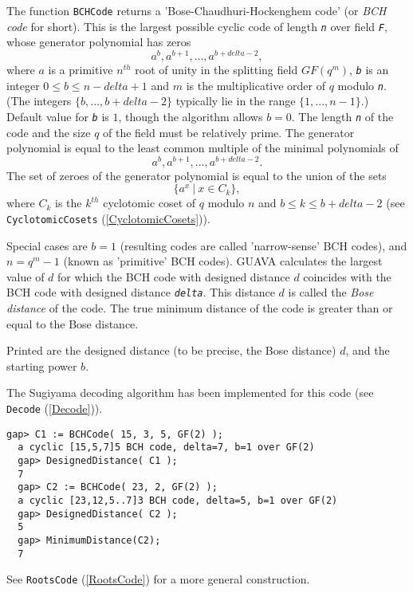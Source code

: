 \documentclass[a4paper,11pt]{report}
\begin{document}
{{{ The function \texttt{BCHCode} returns a 'Bose-Chaudhuri-Hockenghem code' (or \emph{BCH code} for short). This is the largest possible cyclic code of length \mbox{\texttt{\slshape n}} over field \mbox{\texttt{\slshape F}}, whose generator polynomial has zeros 
\[ a^{b},a^{b+1}, ..., a^{b+delta-2}, \]
 where $a$ is a primitive $n^{th}$ root of unity in the splitting field $GF(q^m)$, \mbox{\texttt{\slshape b}} is an integer $0\leq b\leq n-delta+1$ and $m$ is the multiplicative order of $q$ modulo \mbox{\texttt{\slshape n}}. (The integers $\{b,...,b+delta-2\}$ typically lie in the range $\{1,...,n-1\}$.) Default value for \mbox{\texttt{\slshape b}} is $1$, though the algorithm allows $b=0$. The length \mbox{\texttt{\slshape n}} of the code and the size $q$ of the field must be relatively prime. The generator polynomial is equal to
the least common multiple of the minimal polynomials of 
\[ a^{b}, a^{b+1}, ..., a^{b+delta-2}. \]
 The set of zeroes of the generator polynomial is equal to the union of the
sets 
\[ \{a^x\ |\ x \in C_k\}, \]
 where $C_k$ is the $k^{th}$ cyclotomic coset of $q$ modulo $n$ and $b\leq k\leq b+delta-2$ (see \texttt{CyclotomicCosets} (\ref{CyclotomicCosets})). 

 Special cases are $b=1$ (resulting codes are called 'narrow-sense' BCH codes), and $n=q^m-1$ (known as 'primitive' BCH codes). \textsf{GUAVA} calculates the largest value of $d$ for which the BCH code with designed distance $d$ coincides with the BCH code with designed distance \mbox{\texttt{\slshape delta}}. This distance $d$ is called the \emph{Bose distance} of the code. The true minimum distance of the code is greater than or equal to
the Bose distance.  

 Printed are the designed distance (to be precise, the Bose distance) $d$, and the starting power $b$. 

 The Sugiyama decoding algorithm has been implemented for this code (see \texttt{Decode} (\ref{Decode})). }

 
\begin{Verbatim}[fontsize=\small,frame=single,label=Example]
  gap> C1 := BCHCode( 15, 3, 5, GF(2) );
  a cyclic [15,5,7]5 BCH code, delta=7, b=1 over GF(2)
  gap> DesignedDistance( C1 );
  7
  gap> C2 := BCHCode( 23, 2, GF(2) );
  a cyclic [23,12,5..7]3 BCH code, delta=5, b=1 over GF(2)
  gap> DesignedDistance( C2 );       
  5
  gap> MinimumDistance(C2);
  7 
\end{Verbatim}
  See \texttt{RootsCode} (\ref{RootsCode}) for a more general construction.  

}}
\end{document}
